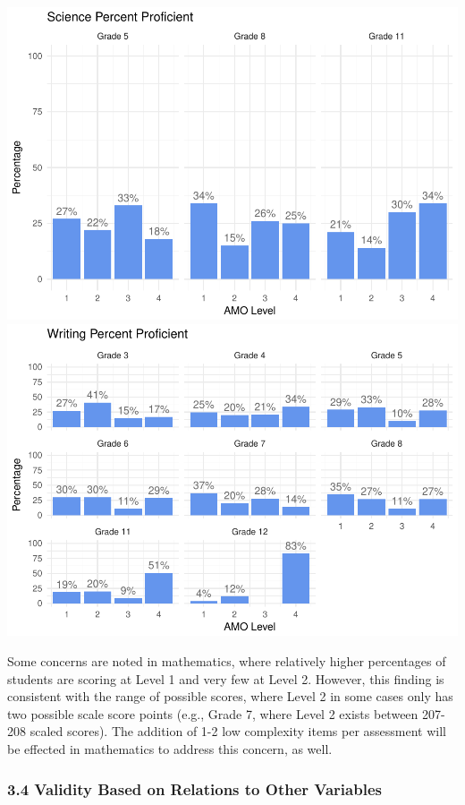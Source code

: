 \documentclass[]{article}
\begin{document}
\includegraphics{tech_report_18_files/figure-latex/amo_plot-4.pdf}
\includegraphics{tech_report_18_files/figure-latex/amo_plot-5.pdf}

Some concerns are noted in mathematics, where relatively higher
percentages of students are scoring at Level 1 and very few at Level 2.
However, this finding is consistent with the range of possible scores,
where Level 2 in some cases only has two possible scale score points
(e.g., Grade 7, where Level 2 exists between 207-208 scaled scores). The
addition of 1-2 low complexity items per assessment will be effected in
mathematics to address this concern, as well.

\subsubsection{3.4 Validity Based on Relations to Other
Variables}\label{validity-based-on-relations-to-other-variables}
\end{document}
